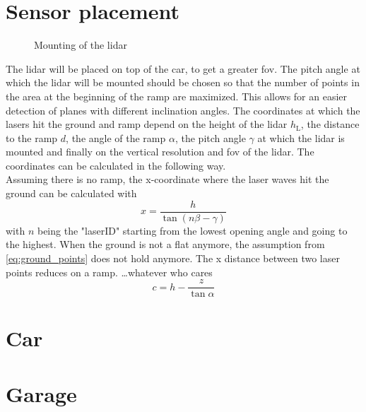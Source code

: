 \section{Sensor placement}
\begin{figure}[htpb]
	\centering
	
	\caption{Mounting of the \acrshort{lidar}}
	\label{fig:tikz_lidar_mount}
\end{figure}
The \acrshort{lidar} will be placed on top of the car, to get a greater \acrshort{fov}.
The pitch angle at which the \acrshort{lidar} will be mounted should be chosen so that the number of points in the area at the beginning of the ramp are maximized.
This allows for an easier detection of planes with different inclination angles.
The coordinates at which the lasers hit the ground and ramp depend on the height of the \acrshort{lidar} $ h_\mathrm{L} $, the distance to the ramp $d$, the angle of the ramp $\alpha$, the pitch angle $\gamma$ at which the \acrshort{lidar} is mounted and finally on the vertical resolution and \acrshort{fov} of the \acrshort{lidar}. The coordinates can be calculated in the following way.\\
Assuming there is no ramp, the x-coordinate where the laser waves hit the ground can be calculated with
\begin{equation}
	x = \frac{h}{\tan(n\beta - \gamma)}
	\label{eq:ground_points}
\end{equation}
with $n$ being the "laserID" starting from the lowest opening angle and going to the highest.
When the ground is not a flat anymore, the assumption from \ref{eq:ground_points} does not hold anymore. The x distance between two laser points reduces on a ramp.
\dots whatever who cares
\[ c = h - \frac{z}{\tan \alpha} \]



\section{Car}



\section{Garage}
